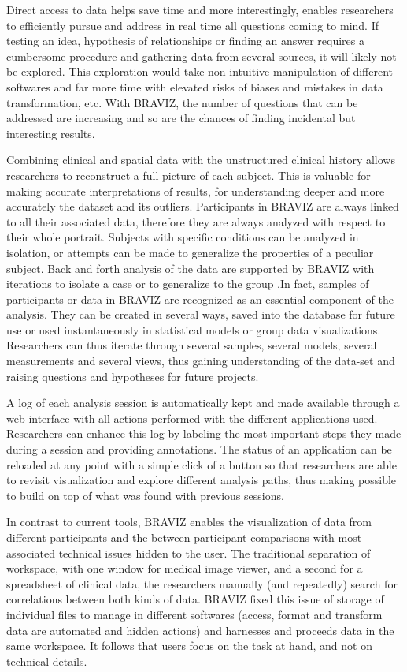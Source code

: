 \documentclass{frontiersHLTH}
\begin{document}
Direct access to data helps save time and more interestingly, enables researchers to efficiently pursue and address in real time all questions coming to mind. If testing an idea, hypothesis of relationships or finding an answer requires a cumbersome procedure and gathering data from several sources, it will likely not be explored. This exploration would take non intuitive manipulation of different softwares and far more time with elevated risks of biases and mistakes in data transformation, etc. With BRAVIZ, the number of questions that can be addressed are increasing and so are the chances of finding incidental but interesting results.


Combining clinical and spatial data with the unstructured clinical history allows researchers to reconstruct a full picture of each subject. This is valuable for making accurate interpretations of results, for understanding deeper and more accurately the dataset and its outliers. Participants in BRAVIZ are always linked to all their associated data, therefore they are always analyzed with respect to their  whole portrait. Subjects with specific conditions can be analyzed in isolation, or attempts can be made to generalize the properties of a peculiar subject. Back and forth analysis of the data are supported by BRAVIZ with iterations to isolate a case or to generalize to the group .In fact, samples of participants or data in BRAVIZ are recognized as an essential component of the analysis. They can be created in several ways, saved into the database for future use or used instantaneously in statistical models or group data visualizations. Researchers can thus iterate through several samples, several models, several measurements and several views, thus gaining understanding of the data-set and raising questions and hypotheses for future projects.

A log of each analysis session is automatically kept and made available through a web interface with all actions performed with the different applications used. Researchers can enhance this log by labeling the most important steps they made during a session and providing annotations. The status of an application can be reloaded at any point with a simple click of a button so that researchers are able to revisit visualization and explore different analysis paths, thus making possible to build on top of what was found with previous sessions.

In contrast to current tools, BRAVIZ enables the visualization of data from different participants and the between-participant comparisons with most associated technical issues hidden to the user. The traditional separation of workspace, with one window for medical image viewer, and a second for a spreadsheet of clinical data, the researchers manually (and repeatedly) search for correlations between both kinds of data. BRAVIZ fixed this issue of storage of individual files to manage in different softwares (access, format and transform data are automated and hidden actions) and harnesses and proceeds data in the same workspace. It follows that users focus on the task at hand, and not on technical details.
\end{document}
